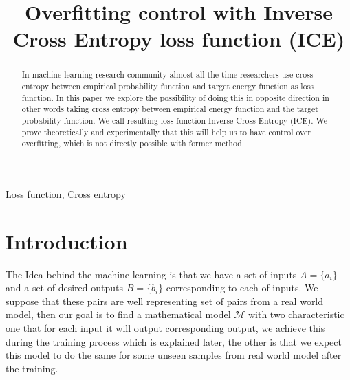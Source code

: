 \documentclass[conference]{IEEEtran}
\begin{document}
\title{Overfitting control with Inverse Cross Entropy loss function (ICE)}

\author{
}

\maketitle

\begin{abstract}
In machine learning research community almost all the time researchers use cross entropy between empirical probability function and
target energy function as loss function. In this paper we explore the possibility of doing this in opposite direction in other words
taking cross entropy between empirical energy function and the target probability function. We call resulting loss function Inverse Cross Entropy (ICE).
We prove theoretically and experimentally that this will help us to have control over overfitting, which is not directly possible with former method.
\end{abstract}

\begin{IEEEkeywords}
Loss function, Cross entropy
\end{IEEEkeywords}

\section{Introduction}
The Idea behind the machine learning is that we have a set of inputs
$A=\{a_i\}$ and a set of desired outputs 
$B=\{b_i\}$ corresponding to each of inputs. We suppose that these pairs are well 
representing set of pairs from a real world model,
then our goal is to find a mathematical model $\mathcal{M}$ with two characteristic one that for 
each input it will output corresponding output, we achieve this during the training process
which is explained later, the other is that we expect this model to do the same 
for some unseen samples from real world model after the training.
\end{document}
